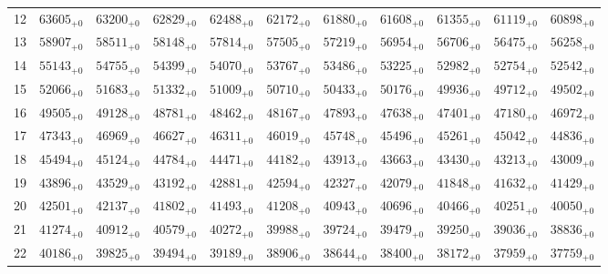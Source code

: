\documentclass[10pt, a4paper]{article}
\begin{document}
\begin{center}
\begin{tabular}{c || c c c c c | c c c c c}
        12 & \({63605}_{+0}\) & \({63200}_{+0}\) & \({62829}_{+0}\) & \({62488}_{+0}\) & \({62172}_{+0}\) & \({61880}_{+0}\) & \({61608}_{+0}\) & \({61355}_{+0}\) & \({61119}_{+0}\) & \({60898}_{+0}\)\\
        13 & \({58907}_{+0}\) & \({58511}_{+0}\) & \({58148}_{+0}\) & \({57814}_{+0}\) & \({57505}_{+0}\) & \({57219}_{+0}\) & \({56954}_{+0}\) & \({56706}_{+0}\) & \({56475}_{+0}\) & \({56258}_{+0}\)\\
        14 & \({55143}_{+0}\) & \({54755}_{+0}\) & \({54399}_{+0}\) & \({54070}_{+0}\) & \({53767}_{+0}\) & \({53486}_{+0}\) & \({53225}_{+0}\) & \({52982}_{+0}\) & \({52754}_{+0}\) & \({52542}_{+0}\)\\
        15 & \({52066}_{+0}\) & \({51683}_{+0}\) & \({51332}_{+0}\) & \({51009}_{+0}\) & \({50710}_{+0}\) & \({50433}_{+0}\) & \({50176}_{+0}\) & \({49936}_{+0}\) & \({49712}_{+0}\) & \({49502}_{+0}\)\\
        \hline
        16 & \({49505}_{+0}\) & \({49128}_{+0}\) & \({48781}_{+0}\) & \({48462}_{+0}\) & \({48167}_{+0}\) & \({47893}_{+0}\) & \({47638}_{+0}\) & \({47401}_{+0}\) & \({47180}_{+0}\) & \({46972}_{+0}\)\\
        17 & \({47343}_{+0}\) & \({46969}_{+0}\) & \({46627}_{+0}\) & \({46311}_{+0}\) & \({46019}_{+0}\) & \({45748}_{+0}\) & \({45496}_{+0}\) & \({45261}_{+0}\) & \({45042}_{+0}\) & \({44836}_{+0}\)\\
        18 & \({45494}_{+0}\) & \({45124}_{+0}\) & \({44784}_{+0}\) & \({44471}_{+0}\) & \({44182}_{+0}\) & \({43913}_{+0}\) & \({43663}_{+0}\) & \({43430}_{+0}\) & \({43213}_{+0}\) & \({43009}_{+0}\)\\
        19 & \({43896}_{+0}\) & \({43529}_{+0}\) & \({43192}_{+0}\) & \({42881}_{+0}\) & \({42594}_{+0}\) & \({42327}_{+0}\) & \({42079}_{+0}\) & \({41848}_{+0}\) & \({41632}_{+0}\) & \({41429}_{+0}\)\\
        20 & \({42501}_{+0}\) & \({42137}_{+0}\) & \({41802}_{+0}\) & \({41493}_{+0}\) & \({41208}_{+0}\) & \({40943}_{+0}\) & \({40696}_{+0}\) & \({40466}_{+0}\) & \({40251}_{+0}\) & \({40050}_{+0}\)\\
        \hline
        21 & \({41274}_{+0}\) & \({40912}_{+0}\) & \({40579}_{+0}\) & \({40272}_{+0}\) & \({39988}_{+0}\) & \({39724}_{+0}\) & \({39479}_{+0}\) & \({39250}_{+0}\) & \({39036}_{+0}\) & \({38836}_{+0}\)\\
        22 & \({40186}_{+0}\) & \({39825}_{+0}\) & \({39494}_{+0}\) & \({39189}_{+0}\) & \({38906}_{+0}\) & \({38644}_{+0}\) & \({38400}_{+0}\) & \({38172}_{+0}\) & \({37959}_{+0}\) & \({37759}_{+0}\)\\

\end{tabular}
\end{center}
\end{document}
